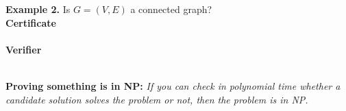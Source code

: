 \documentclass[11  pt]{article}
\begin{document}
	\vfill
	\textbf{Example 2.} Is $G = (V,E)$ a connected graph? \\
	
	\textbf{Certificate} \\ \\ %
	
	
	\textbf{Verifier} \\ \\ %
	
	\vfill
	
	\noindent \textbf{Proving something is in NP:}
	\emph{If you can check in polynomial time whether a candidate solution solves the problem or not, then the problem is in NP.}
	
	\newpage 
	
%	
%	
%	
%	
\end{document}
